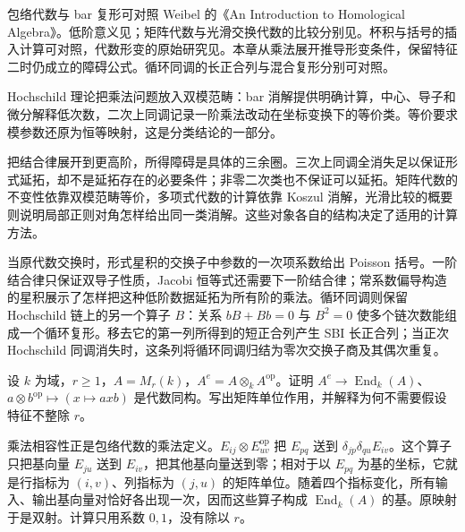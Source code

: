 \ProseParagraphBreak
包络代数与 bar 复形可对照 Weibel 的《An Introduction to Homological Algebra》\cite[Section 9.1]{Weibel1994HomologicalAlgebra}。低阶意义见\cite[Lemma 9.2.1, Proposition 9.2.2; Classification Theorem 9.3.1]{Weibel1994HomologicalAlgebra}；矩阵代数与光滑交换代数的比较分别见\cite[Section 9.5; Theorem 9.4.7]{Weibel1994HomologicalAlgebra}。杯积与括号的插入计算可对照\cite[Sections 2, 5--8]{Gerstenhaber1963CohomologyStructure}，代数形变的原始研究见\cite{Gerstenhaber1964DeformationRings}。本章从乘法展开推导形变条件，保留特征二时仍成立的障碍公式。循环同调的长正合列与混合复形分别可对照\cite[Proposition 9.6.11; Section 9.8]{Weibel1994HomologicalAlgebra}。








\begin{chaptersummary}
	Hochschild 理论把乘法问题放入双模范畴：bar 消解提供明确计算，中心、导子和微分解释低次数，二次上同调记录一阶乘法改动在坐标变换下的等价类。等价要求模参数还原为恒等映射，这是分类结论的一部分。

	\ProseParagraphBreak
	把结合律展开到更高阶，所得障碍是具体的三余圈。三次上同调全消失足以保证形式延拓，却不是延拓存在的必要条件；非零二次类也不保证可以延拓。矩阵代数的不变性依靠双模范畴等价，多项式代数的计算依靠 Koszul 消解，光滑比较的概要则说明局部正则对角怎样给出同一类消解。这些对象各自的结构决定了适用的计算方法。

	\ProseParagraphBreak
	当原代数交换时，形式星积的交换子中参数的一次项系数给出 Poisson 括号。一阶结合律只保证双导子性质，Jacobi 恒等式还需要下一阶结合律；常系数偏导构造的星积展示了怎样把这种低阶数据延拓为所有阶的乘法。循环同调则保留 Hochschild 链上的另一个算子 \(B\)：关系 \(bB+Bb=0\) 与 \(B^2=0\) 使多个链次数能组成一个循环复形。移去它的第一列所得到的短正合列产生 SBI 长正合列；当正次 Hochschild 同调消失时，这条列将循环同调归结为零次交换子商及其偶次重复。
\end{chaptersummary}

\BookExercises

\begin{optionalexercise}\label{b4:ex:12-matrix-envelope}
	设 \(k\) 为域，\(r\ge1\)，\(A=M_r(k)\)，\(A^e=A\otimes_kA^{\mathrm{op}}\)。证明 \(A^e\to\operatorname{End}_k(A)\)、\(a\otimes b^{\mathrm{op}}\mapsto(x\mapsto axb)\) 是代数同构。写出矩阵单位作用，并解释为何不需要假设特征不整除 \(r\)。
\end{optionalexercise}
\begin{solution}
	乘法相容性正是包络代数的乘法定义。\(E_{ij}\otimes E_{uv}^{\mathrm{op}}\) 把 \(E_{pq}\) 送到 \(\delta_{jp}\delta_{qu}E_{iv}\)。这个算子只把基向量 \(E_{ju}\) 送到 \(E_{iv}\)，把其他基向量送到零；相对于以 \(E_{pq}\) 为基的坐标，它就是行指标为 \((i,v)\)、列指标为 \((j,u)\) 的矩阵单位。随着四个指标变化，所有输入、输出基向量对恰好各出现一次，因而这些算子构成 \(\operatorname{End}_k(A)\) 的基。原映射于是双射。计算只用系数 \(0,1\)，没有除以 \(r\)。
\end{solution}

